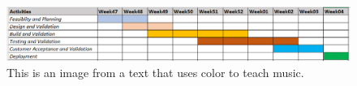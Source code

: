 \label{sec:milestone}
\begin{figure}[htbp]
	\includegraphics{BvxScA.png}
	\caption{This is an image from a text that uses color to teach music.}
	\label{fig}
\end{figure}
